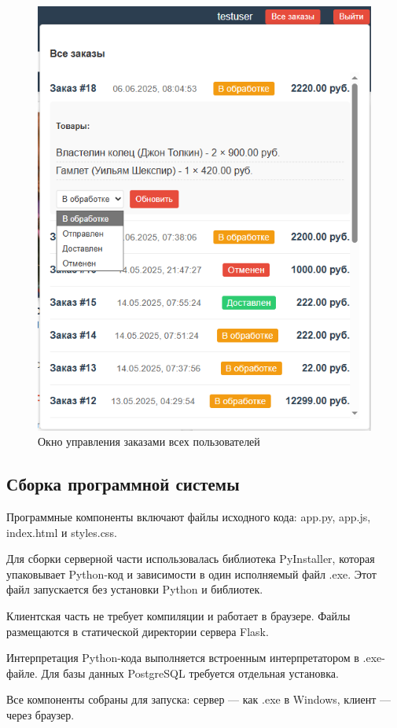 \begin{figure}[H]
	\centering
	\includegraphics[width=0.5\linewidth]{images/админзаказы}
	\caption{Окно управления заказами всех пользователей}
	\label{fig:}
\end{figure}

\subsection{Сборка программной системы}
Программные компоненты включают файлы исходного кода: app.py, app.js, index.html и styles.css.

Для сборки серверной части использовалась библиотека PyInstaller, которая упаковывает Python-код и зависимости в один исполняемый файл .exe. Этот файл запускается без установки Python и библиотек.

Клиентская часть не требует компиляции и работает в браузере. Файлы размещаются в статической директории сервера Flask.

Интерпретация Python-кода выполняется встроенным интерпретатором в .exe-файле. Для базы данных PostgreSQL требуется отдельная установка.

Все компоненты собраны для запуска: сервер — как .exe в Windows, клиент — через браузер.